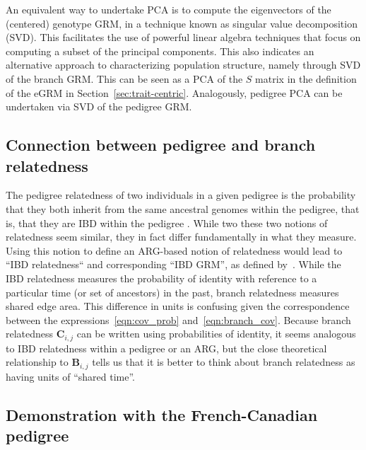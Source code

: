 An equivalent way to undertake PCA is to compute the eigenvectors of the (centered) genotype GRM, in a technique known as singular value decomposition (SVD). This facilitates the use of powerful linear algebra techniques that focus on computing a subset of the principal components. This also indicates an alternative approach to characterizing population structure, namely through SVD of the branch GRM. This can be seen as a PCA of the $S$ matrix in the definition of the eGRM in Section~\ref{sec:trait-centric}. \cite{fan2022genealogical}  Analogously, pedigree PCA can be undertaken via SVD of the pedigree GRM. 

\subsection{Connection between pedigree and branch relatedness}
The pedigree relatedness of two individuals in a given pedigree is
the probability that they both inherit from the same ancestral genomes within the pedigree,
that is, that they are IBD within the pedigree \citep{malecot1969mathemathics}.
While two these two notions of relatedness seem similar,
they in fact differ fundamentally in what they measure.
%
Using this notion to define an ARG-based notion of relatedness would lead to ``IBD relatedness``
and corresponding ``IBD GRM'',
as defined by~\citet{tsambos2022efficient}.
%
While the IBD relatedness measures the
probability of identity with reference to a particular time (or set of ancestors) in the past,
branch relatedness measures shared edge area.
%
This difference in units is confusing given the correspondence between
the expressions~\eqref{eqn:cov_prob} and~\eqref{eqn:branch_cov}.
%
Because branch relatedness $\mathbf{C}_{i,j}$ can be written using probabilities of identity,
it seems analogous to IBD relatedness within a pedigree or an ARG,
but the close theoretical relationship to $\mathbf{B}_{i,j}$
tells us that it is better to think about branch relatedness as having units of ``shared time''.


\subsection{Demonstration with the French-Canadian pedigree}

